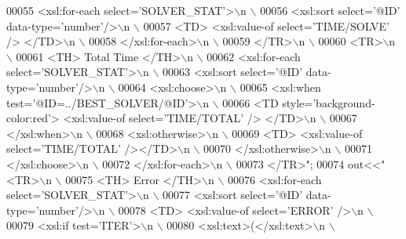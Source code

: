 \begin{DoxyCode}
{00055 \textcolor{stringliteral}{            <xsl:for-each select='SOLVER\_STAT'>\(\backslash\)n \(\backslash\)}
00056 \textcolor{stringliteral}{              <xsl:sort select='@ID' data-type='number'/>\(\backslash\)n \(\backslash\)}
00057 \textcolor{stringliteral}{              <TD> <xsl:value-of select='TIME/SOLVE' /> </TD>\(\backslash\)n \(\backslash\)}
00058 \textcolor{stringliteral}{            </xsl:for-each>\(\backslash\)n \(\backslash\)}
00059 \textcolor{stringliteral}{          </TR>\(\backslash\)n \(\backslash\)}
00060 \textcolor{stringliteral}{          <TR>\(\backslash\)n \(\backslash\)}
00061 \textcolor{stringliteral}{            <TH> Total Time </TH>\(\backslash\)n \(\backslash\)}
00062 \textcolor{stringliteral}{            <xsl:for-each select='SOLVER\_STAT'>\(\backslash\)n \(\backslash\)}
00063 \textcolor{stringliteral}{              <xsl:sort select='@ID' data-type='number'/>\(\backslash\)n \(\backslash\)}
00064 \textcolor{stringliteral}{              <xsl:choose>\(\backslash\)n \(\backslash\)}
00065 \textcolor{stringliteral}{                <xsl:when test='@ID=../BEST\_SOLVER/@ID'>\(\backslash\)n \(\backslash\)}
00066 \textcolor{stringliteral}{                  <TD style='background-color:red'> <xsl:value-of select='TIME/TOTAL' />  </TD>\(\backslash\)n \(\backslash\)}
00067 \textcolor{stringliteral}{                </xsl:when>\(\backslash\)n \(\backslash\)}
00068 \textcolor{stringliteral}{                <xsl:otherwise>\(\backslash\)n \(\backslash\)}
00069 \textcolor{stringliteral}{                  <TD>  <xsl:value-of select='TIME/TOTAL' /></TD>\(\backslash\)n \(\backslash\)}
00070 \textcolor{stringliteral}{                </xsl:otherwise>\(\backslash\)n \(\backslash\)}
00071 \textcolor{stringliteral}{              </xsl:choose>\(\backslash\)n \(\backslash\)}
00072 \textcolor{stringliteral}{            </xsl:for-each>\(\backslash\)n \(\backslash\)}
00073 \textcolor{stringliteral}{          </TR>"};
00074   out<<\textcolor{stringliteral}{"  <TR>\(\backslash\)n \(\backslash\)}
00075 \textcolor{stringliteral}{              <TH> Error </TH>\(\backslash\)n \(\backslash\)}
00076 \textcolor{stringliteral}{              <xsl:for-each select='SOLVER\_STAT'>\(\backslash\)n \(\backslash\)}
00077 \textcolor{stringliteral}{                <xsl:sort select='@ID' data-type='number'/>\(\backslash\)n \(\backslash\)}
00078 \textcolor{stringliteral}{                <TD> <xsl:value-of select='ERROR' />\(\backslash\)n \(\backslash\)}
00079 \textcolor{stringliteral}{                <xsl:if test='ITER'>\(\backslash\)n \(\backslash\)}
00080 \textcolor{stringliteral}{                  <xsl:text>(</xsl:text>\(\backslash\)n \(\backslash\)}
}
\end{DoxyCode}
